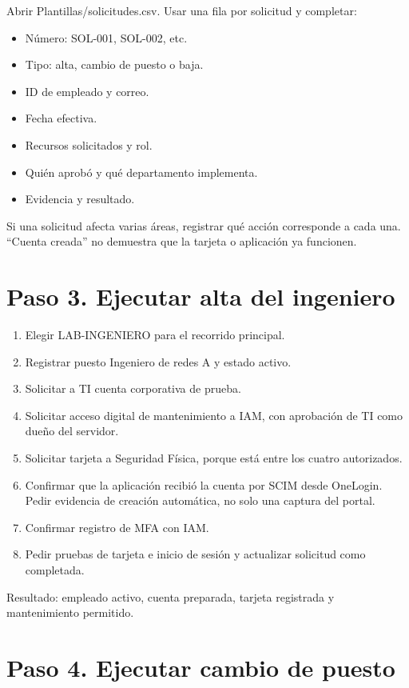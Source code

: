 \documentclass[12pt,a4paper]{article}
\begin{document}
Abrir \textnormal{Plantillas/\allowbreak{}solicitudes.csv}. Usar una fila por solicitud y completar:\par
\begin{itemize}
\item Número: SOL-001, SOL-002, etc.
\item Tipo: alta, cambio de puesto o baja.
\item ID de empleado y correo.
\item Fecha efectiva.
\item Recursos solicitados y rol.
\item Quién aprobó y qué departamento implementa.
\item Evidencia y resultado.
\end{itemize}
Si una solicitud afecta varias áreas, registrar qué acción corresponde a cada una. “Cuenta creada” no demuestra que la tarjeta o aplicación ya funcionen.\par
{}\section*{Paso 3. Ejecutar alta del ingeniero}
\begin{enumerate}
\item Elegir LAB-INGENIERO para el recorrido principal.
\item Registrar puesto Ingeniero de redes A y estado activo.
\item Solicitar a TI cuenta corporativa de prueba.
\item Solicitar acceso digital de mantenimiento a IAM, con aprobación de TI como dueño del servidor.
\item Solicitar tarjeta a Seguridad Física, porque está entre los cuatro autorizados.
\item Confirmar que la aplicación recibió la cuenta por SCIM desde OneLogin. Pedir evidencia de creación automática, no solo una captura del portal.
\item Confirmar registro de MFA con IAM.
\item Pedir pruebas de tarjeta e inicio de sesión y actualizar solicitud como completada.
\end{enumerate}
Resultado: empleado activo, cuenta preparada, tarjeta registrada y mantenimiento permitido.\par
{}\section*{Paso 4. Ejecutar cambio de puesto}
\end{document}
